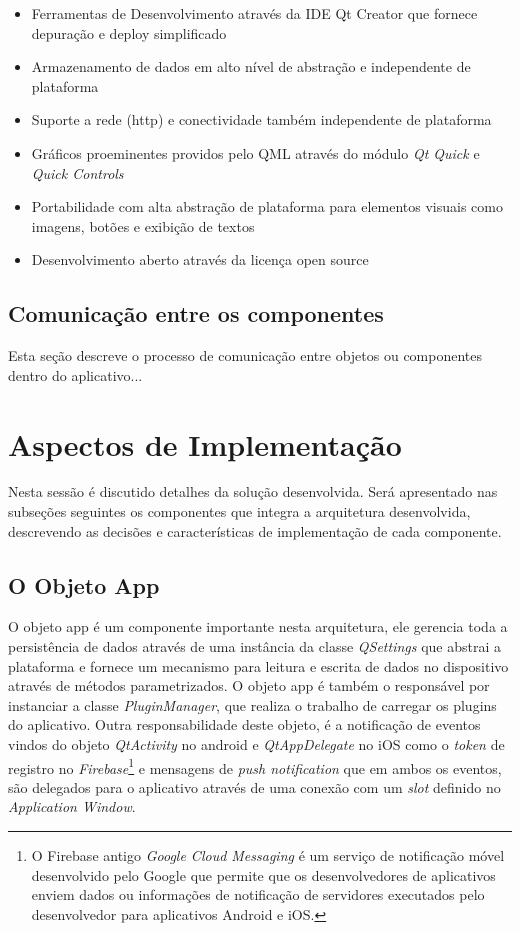 \begin{itemize}
	\item Ferramentas de Desenvolvimento através da IDE Qt Creator que fornece depuração e deploy simplificado
	\item Armazenamento de dados em alto nível de abstração e independente de plataforma
	\item Suporte a rede (http) e conectividade também independente de plataforma
	\item Gráficos proeminentes providos pelo QML através do módulo \textit{Qt Quick} e \textit{Quick Controls}
	\item Portabilidade com alta abstração de plataforma para elementos visuais como imagens, botões e exibição de textos
	\item Desenvolvimento aberto através da licença open source
\end{itemize}

\subsection{Comunicação entre os componentes}
Esta seção descreve o processo de comunicação entre objetos ou componentes dentro do aplicativo...


\section{Aspectos de Implementação}\label{sec:solucao-desenvolvida}
Nesta sessão é discutido detalhes da solução desenvolvida. Será apresentado nas subseções seguintes os componentes que integra a arquitetura desenvolvida, descrevendo as decisões e características de implementação de cada componente.



\subsection{O Objeto App}\label{sec:solucao-desenvolvida}
O objeto app é um componente importante nesta arquitetura, ele gerencia toda a persistência de dados através de uma instância da classe \textit{QSettings} que abstrai a plataforma e fornece um mecanismo para leitura e escrita de dados no dispositivo através de métodos parametrizados. O objeto app é também o responsável por instanciar a classe \textit{PluginManager}, que realiza o trabalho de carregar os plugins do aplicativo. Outra responsabilidade deste objeto, é a notificação de eventos vindos do objeto \textit{QtActivity} no android e \textit{QtAppDelegate} no iOS como o \textit{token} de registro no \textit{Firebase}\footnote{O Firebase antigo \textit{Google Cloud Messaging} é um serviço de notificação móvel desenvolvido pelo Google que permite que os desenvolvedores de aplicativos enviem dados ou informações de notificação de servidores executados pelo desenvolvedor para aplicativos Android e iOS.} e mensagens de \textit{push notification} que em ambos os eventos, são delegados para o aplicativo através de uma conexão com um \textit{slot} definido no \textit{Application Window}.


